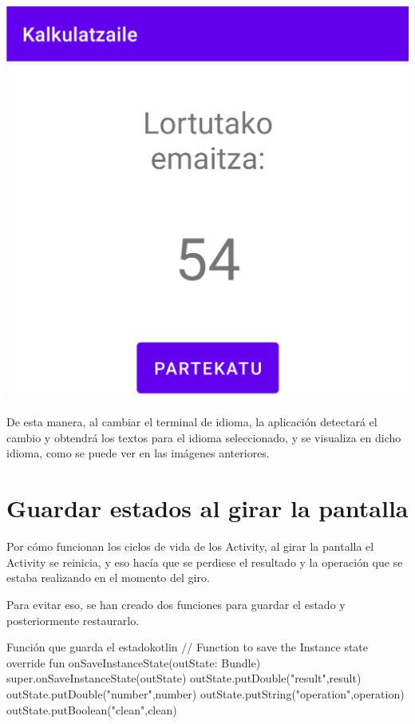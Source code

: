 \documentclass{\ClassPath/viu-tfm-template}
\begin{document}
{\begin{minipage}{0.32\linewidth}
\end{minipage}
\hfill
\begin{minipage}{0.32\linewidth}
    \includegraphics[frame,width=\linewidth]{img/euskara.png}
\end{minipage}

}

De esta manera, al cambiar el terminal de idioma, la aplicación detectará el cambio y obtendrá los textos para el idioma seleccionado, y se visualiza en dicho idioma, como se puede ver en las imágenes anteriores.


\section{Guardar estados al girar la pantalla}

Por cómo funcionan los ciclos de vida de los Activity, al girar la pantalla el Activity se reinicia, y eso hacía que se perdiese el resultado y la operación que se estaba realizando en el momento del giro.

Para evitar eso, se han creado dos funciones para guardar el estado y posteriormente restaurarlo.

\begin{mycode}{Función que guarda el estado}{kotlin}{}
// Function to save the Instance state
override fun onSaveInstanceState(outState: Bundle) {
    super.onSaveInstanceState(outState)
    outState.putDouble("result",result)
    outState.putDouble("number",number)
    outState.putString("operation",operation)
    outState.putBoolean("clean",clean)
}
\end{mycode}
\end{document}
